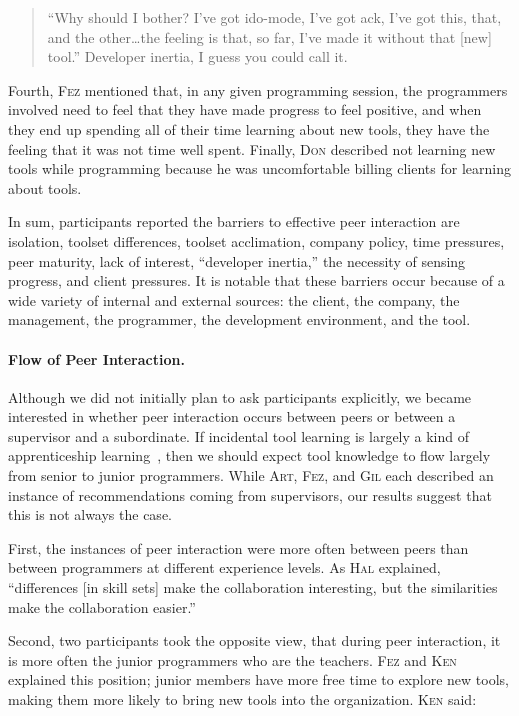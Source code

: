 \documentclass[smallextended]{svjour3}
\newcommand\discovery{peer interaction\xspace}
\newcommand\DisCovery{Peer Interaction\xspace}
\newcommand{\subject}[1]{\textsc{#1}}
\newcommand{\fsub}{{\subject{Art}}\xspace}
\newcommand{\hsub}{{\subject{Fez}}\xspace}
\newcommand{\msub}{{\subject{Don}}\xspace}
\newcommand{\osub}{{\subject{Ken}}\xspace}
\newcommand{\psub}{{\subject{Hal}}\xspace}
\newcommand{\rsub}{{\subject{Gil}}\xspace}
\begin{document}
\begin{quote}
``Why should I bother?  I've got ido-mode, I've got ack, I've got this, that,
and the other\ldots the feeling is that, so far, I've made it without that
[new] tool.''
Developer inertia, I guess you could call it.
\end{quote}

\noindent
Fourth, \hsub mentioned that, in any given programming session, the programmers
involved need to feel that they have made progress to feel positive, and when
they end up spending all of their time learning about new tools, they have the
feeling that it was not time well spent.
Finally, \msub described not learning new tools while programming because he
was uncomfortable billing clients for learning about tools.

In sum, participants reported the barriers to effective \discovery are 
isolation, toolset differences, toolset acclimation, company policy, time
pressures, peer maturity, lack of interest, ``developer inertia,''
the necessity of sensing progress, and client pressures.
It is notable that these barriers occur because of a wide variety of
internal and external sources: the client, the company, the
management, the programmer, the development environment, and the tool.

\paragraph{Flow of \DisCovery.}\label{sec:flow}

\noindent
Although we did not initially plan to ask participants explicitly, we became interested in
whether \discovery occurs between peers or between a supervisor
and a subordinate.
If incidental tool learning is largely a kind of 
apprenticeship learning~\cite{lave}, then we should expect tool knowledge to
flow largely from senior to junior programmers.
While \fsub, \hsub, and \rsub each described an instance of recommendations
coming from supervisors, our results suggest that this is not always the case.

First, the instances of \discovery were more often between peers
than between programmers at different experience levels.
As \psub explained, ``differences [in skill sets] make the collaboration
interesting, but the similarities make the collaboration easier.''

Second, two participants took the opposite view, that during \discovery, it is more often
the junior programmers who are the teachers. 
\hsub and \osub explained this position; junior members have more
free time to explore new tools, making them more likely to bring new tools
into the organization.
\osub said:
\end{document}
